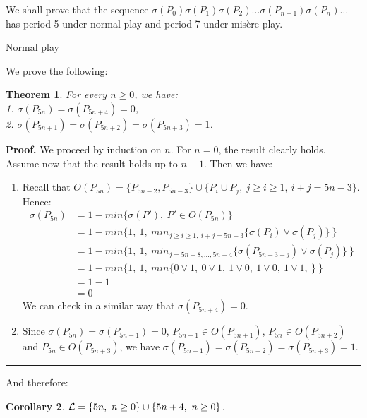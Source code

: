 \documentclass[11pt]{article}
\newcommand{\centre}[1]{\begin{center}#1\end{center}}
\newcommand{\LL}{{\cal L}}
\newtheorem{theorem}{Theorem}
\newtheorem{corollary}[theorem]{Corollary}
\newcommand\qed{\mbox{}\hfill\rule{0.5em}{0.809em}\par\vskip 5mm}
\newenvironment{proof}[0]{\noindent\textbf{Proof.}}{\qed}
\begin{document}
We shall prove that the sequence 
$\sigma(P_0)\sigma(P_1)\sigma(P_2)\dots\sigma(P_{n-1})\sigma(P_n)\dots\ $
has period 5 under normal play and period 7 under mis\`ere play.

\vskip 4mm

\centre{{\sc Normal play}}

We prove the following:

\begin{theorem}
For every $n\geq 0$, we have:\\
1. $\sigma(P_{5n})=\sigma(P_{5n+4})=0$,\\
2. $\sigma(P_{5n+1})=\sigma(P_{5n+2})=\sigma(P_{5n+3})=1$.
\label{th:selective-normal}
\end{theorem}

\begin{proof}
We proceed by induction on $n$. 
For $n=0$, the result clearly holds.
Assume now that the result holds up to $n-1$. Then we have:

\begin{enumerate}

\item 
Recall that 
$O(P_{5n})=\{ P_{5n-2},P_{5n-3}\}\cup\{P_i\cup P_j,\
j\ge i\ge 1,\ i+j=5n-3\}$. Hence:
$$\begin{array}{rl}
\sigma(P_{5n}) & = 1 - min\{\sigma(P'),\ P'\in O(P_{5n})\} \\
 & = 1 - min\{1,\ 1,\ min_{j\ge i\ge 1,\ i+j=5n-3}\{\sigma(P_i)\vee\sigma(P_j)\}\ \} \\
 & = 1 - min\{1,\ 1,\ min_{j=5n-8,\dots,5n-4}\{\sigma(P_{5n-3-j})\vee\sigma(P_j)\}\ \} \\
 & = 1 - min\{1,\ 1,\ min\{0\vee 1,\ 0\vee 1,\ 1\vee 0,\ 1\vee 0,\
                1\vee 1,\ \}\ \} \\
 & = 1 - 1 \\
 & = 0
\end{array}$$
We can check in a similar way that $\sigma(P_{5n+4})=0$.

\item 
Since $\sigma(P_{5n})=\sigma(P_{5n-1})=0$,
$P_{5n-1}\in O(P_{5n+1})$, 
$P_{5n}\in O(P_{5n+2})$ and
$P_{5n}\in O(P_{5n+3})$, 
we have $\sigma(P_{5n+1})=\sigma(P_{5n+2})=\sigma(P_{5n+3})=1$.

\end{enumerate}
\end{proof}

And therefore:

\begin{corollary}
$\LL=\{5n,\ n\ge 0\}\cup\{5n+4,\ n\ge 0\}$.
\end {corollary}
\end{document}
